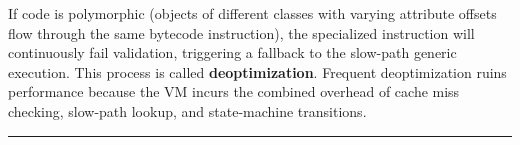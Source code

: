If code is polymorphic (objects of different classes with varying
attribute offsets flow through the same bytecode instruction), the
specialized instruction will continuously fail validation, triggering a
fallback to the slow-path generic execution. This process is called
\textbf{deoptimization}. Frequent deoptimization ruins performance
because the VM incurs the combined overhead of cache miss checking,
slow-path lookup, and state-machine transitions.

\begin{center}\rule{0.5\linewidth}{0.5pt}\end{center}
